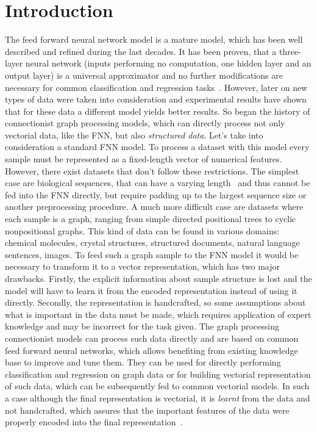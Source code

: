 \documentclass[]{spie}  %
\begin{document}
\section{Introduction}
The feed forward neural network model is a mature model, which has been well described and refined during the last decades. It has been proven, that a three-layer neural network (inputs performing no computation, one hidden layer and an output layer) is a universal approximator and no further modifications are necessary for common classification and regression tasks~\cite{hornik1989multilayer}. However, later on new types of data were taken into consideration and experimental results have shown that for these data a different model yields better results. So began the history of connectionist graph processing models, which can directly process not only vectorial data, like the FNN, but also \emph{structured data}. Let's take into consideration a standard FNN model. To process a dataset with this model every sample must be represented as a fixed-length vector of numerical features. However, there exist datasets that don't follow these restrictions. The simplest case are biological sequences, that can have a varying length~\cite{saha2006prediction} and thus cannot be fed into the FNN directly, but require padding up to the largest sequence size or another preprocessing procedure. A much more difficult case are datasets where each sample is a graph, ranging from simple directed positional trees to cyclic nonpositional graphs. This kind of data can be found in various domains: chemical molecules, crystal structures, structured documents, natural language sentences, images. To feed such a graph sample to the FNN model it would be necessary to transform it to a vector representation, which has two major drawbacks. Firstly, the explicit information about sample structure is lost and the model will have to learn it from the encoded representation instead of using it directly. Secondly, the representation is handcrafted, so some assumptions about what is important in the data must be made, which requires application of expert knowledge and may be incorrect for the task given. The graph processing connectionist models can process such data directly and are based on common feed forward neural networks, which allows benefiting from existing knowledge base to improve and tune them. They can be used for directly performing classification and regression on graph data or for building vectorial representation of such data, which can be subsequently fed to common vectorial models. In such a case although the final representation is vectorial, it is \emph{learnt} from the data and not handcrafted, which assures that the important features of the data were properly encoded into the final representation~\cite{goulon2005hopfield}.
\end{document}
